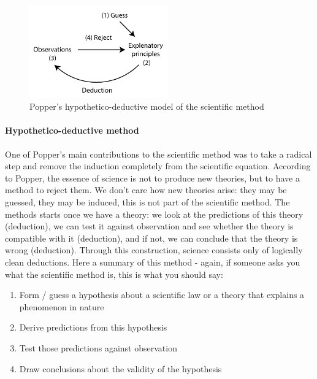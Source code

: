 \documentclass{tufte-book}
\begin{document}
\begin{figure}[]
\begin{center}
\includegraphics[width = 6cm]{figures/HypotheticoDeductivePopper.pdf}
\caption{Popper's hypothetico-deductive model of the scientific method}
\label{fig: InductiveDeductiveAristotle}
\end{center}
\end{figure}

\paragraph{Hypothetico-deductive method} One of Popper's main contributions to the scientific method was to take a radical step and remove the induction completely from the scientific equation. According to Popper, the essence of science is not to produce new theories, but to have a method to reject them. We don't care how new theories arise: they may be guessed, they may be induced, this is not part of the scientific method. The methods starts once we have a theory: we look at the predictions of this theory (deduction), we can test it against observation and see whether the theory is compatible with it (deduction), and if not, we can conclude that the theory is wrong (deduction). Through this construction, science consists only of logically clean deductions. Here a summary of this method - again, if someone asks you what the scientific method is, this is what you should say:


\begin{enumerate}
\item Form / guess a hypothesis about a scientific law or a theory that explains a phenomenon in nature
\item Derive predictions from this hypothesis
\item Test those predictions against observation
\item Draw conclusions about the validity of the hypothesis
\end{enumerate}
\end{document}
